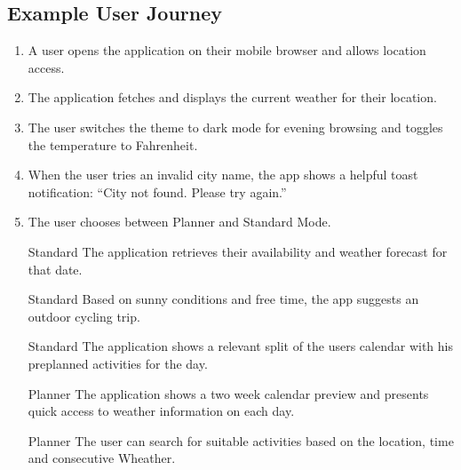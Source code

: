 \documentclass[fontsize=13pt,a4paper]{scrartcl}
\begin{document}
\subsection{Example User Journey}
\begin{enumerate}[nosep]
  \item A user opens the application on their mobile browser and allows location access.
  \item The application fetches and displays the current weather for their location.
  \item The user switches the theme to dark mode for evening browsing and toggles the temperature to Fahrenheit.
  \item When the user tries an invalid city name, the app shows a helpful toast notification: “City not found. Please try again.”
  \item The user chooses between Planner and Standard Mode.
  \item [Standard] The application retrieves their availability and weather forecast for that date.
  \item [Standard] Based on sunny conditions and free time, the app suggests an outdoor cycling trip.
  \item [Standard] The application shows a relevant split of the users calendar with his preplanned activities for the day.
  \item [Planner] The application shows a two week calendar preview and presents quick access to weather information on each day.
  \item [Planner] The user can search for suitable activities based on the location, time and consecutive Wheather.
\end{enumerate}

\newpage
\end{document}

